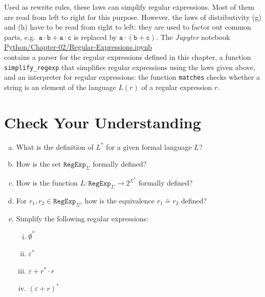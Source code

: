 Used as rewrite rules, these laws can simplify regular expressions.  Most of them are read from left to right
for this purpose.  However, the laws of distributivity (g) and (h) have to be read from right to left: they are
used to factor out common parts, e.g.~$\mathtt{a} \cdot \mathtt{b} + \mathtt{a} \cdot \mathtt{c}$ is
replaced by $\mathtt{a} \cdot (\mathtt{b} + \mathtt{c})$.  The \textsl{Jupyter}
notebook
\\[0.2cm]
\hspace*{1.3cm}
\href{https://github.com/karlstroetmann/Formal-Languages/blob/master/Python/Chapter-02/Regular-Expressions.ipynb}{Python/Chapter-02/Regular-Expressions.ipynb}
\\[0.2cm]
contains a parser for the regular expressions defined in this chapter, a function \texttt{simplify\_regexp}
that simplifies regular expressions using the laws given above, and an interpreter for regular expressions:
the function \texttt{matches} checks whether a string is an element of the language $L(r)$ of a regular
expression $r$.
\pagebreak

\section{Check Your Understanding}
\begin{enumerate}[(a)]
\item What is the definition of $ L^* $ for a given formal language $ L $?
\item How is the set $ \texttt{RegExp}_\Sigma $ formally defined?
\item How is the function $ L: \texttt{RegExp}_\Sigma \rightarrow 2^{\Sigma^*} $ formally defined?
\item For $ r_1, r_2 \in \texttt{RegExp}_\Sigma $, how is the equivalence $ r_1 \doteq r_2 $ defined?
\item Simplify the following regular expressions:
  \begin{enumerate}[i.]
  \item $\emptyset^*$
  \item $\varepsilon^*$
  \item $\varepsilon + r^* \cdot r$
  \item $(\varepsilon + r)^*$
  \end{enumerate}
\end{enumerate}




